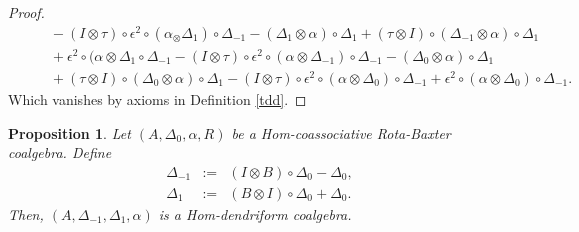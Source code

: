 \documentclass{article}
\newtheorem{prop}[thm]{Proposition}
\theoremstyle{definition}
\theoremstyle{remark}
\numberwithin{equation}{section}
\begin{document}
\begin{proof}
\begin{eqnarray}
&&\quad-(I\otimes\tau)\circ\epsilon^2\circ(\alpha_\otimes\Delta_1)\circ\Delta_{-1}-(\Delta_1\otimes\alpha)\circ\Delta_1+(\tau\otimes I)\circ(\Delta_{-1}\otimes\alpha)\circ\Delta_1\nonumber\\
&&\quad + \epsilon^2\circ(\alpha\otimes\Delta_1\circ\Delta_{-1}-(I\otimes\tau)\circ\epsilon^2\circ(\alpha\otimes\Delta_{-1})\circ\Delta_{-1}-(\Delta_0\otimes\alpha)\circ\Delta_1\nonumber\\
&&\quad+(\tau\otimes I)\circ(\Delta_0\otimes\alpha)\circ\Delta_1-(I\otimes\tau)\circ\epsilon^2\circ(\alpha\otimes\Delta_0)\circ\Delta_{-1}+\epsilon^2\circ(\alpha\otimes\Delta_0)\circ\Delta_{-1}.
 \end{eqnarray}
Which vanishes by axioms in Definition \ref{tdd}.
\end{proof}
\begin{prop}
 Let $(A, \Delta_0, \alpha, R)$ be a Hom-coassociative Rota-Baxter coalgebra. Define
\begin{eqnarray}
\Delta_{-1} &:=&(I\otimes B)\circ\Delta_0 -\Delta_0,\nonumber\\
\Delta_1 &:=&(B\otimes I)\circ\Delta_0 +\Delta_0\nonumber.
\end{eqnarray}
 Then,
$(A, \Delta_{-1}, \Delta_1, \alpha)$ is a Hom-dendriform coalgebra.
\end{prop}
\end{document}
